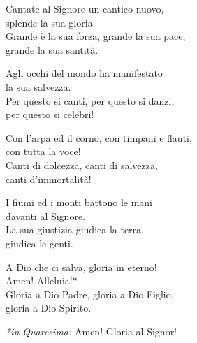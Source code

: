 
\strofa Cantate al Signore un cantico nuovo,\\
splende la sua gloria.\\
Grande è la sua forza, grande la sua pace,\\
grande la sua santità.

\spazio


\spazio

\strofa Agli occhi del mondo ha manifestato\\
la sua salvezza.\\
Per questo si canti, per questo si danzi,\\
per questo si celebri!

\spazio


\spazio

\strofa Con l'arpa ed il corno, con timpani e flauti,\\
con tutta la voce!\\
Canti di dolcezza, canti di salvezza,\\
canti d'immortalità!

\spazio


\spazio

\strofa I fiumi ed i monti battono le mani\\
davanti al Signore.\\
La sua giustizia giudica la terra,\\
giudica le genti.

\spazio


\spazio

\strofa A Dio che ci salva, gloria in eterno!\\
Amen! Alleluia!*\\
Gloria a Dio Padre, gloria a Dio Figlio,\\
gloria a Dio Spirito.

\spazio


\spazio

\emph{*in Quaresima:} Amen! Gloria al Signor!
